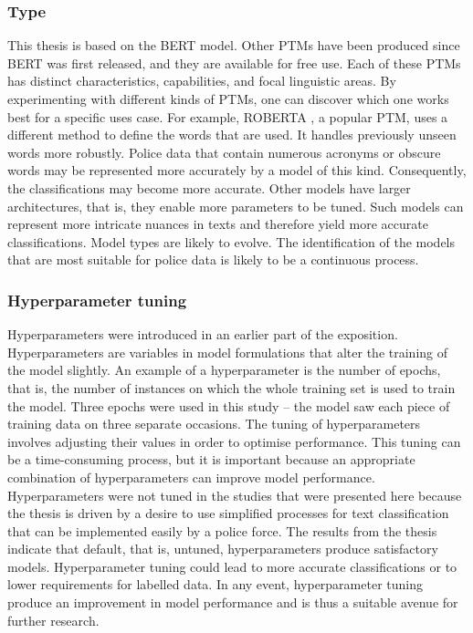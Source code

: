 \subsubsection{Type} This thesis is based on the BERT model. Other PTMs have been produced since BERT was first released, and they are available for free use. Each of these PTMs has distinct characteristics, capabilities, and focal linguistic areas. By experimenting with different kinds of PTMs, one can discover which one works best for a specific uses case. For example, ROBERTA \parencite{liu2019roberta}, a popular PTM, uses a different method to define the words that are used. It handles previously unseen words more robustly. Police data that contain numerous acronyms or obscure words may be represented more accurately by a model of this kind. Consequently, the classifications may become more accurate. Other models have larger architectures, that is, they enable more parameters to be tuned. Such models can represent more intricate nuances in texts and therefore yield more accurate classifications. Model types are likely to evolve. The identification of the models that are most suitable for police data is likely to be a continuous process.

\subsubsection{Hyperparameter tuning} Hyperparameters were introduced in an earlier part of the exposition. Hyperparameters are variables in model formulations that alter the training of the model slightly. An example of a hyperparameter is the number of epochs, that is, the number of instances on which the whole training set is used to train the model. Three epochs were used in this study – the model saw each piece of training data on three separate occasions. The tuning of hyperparameters involves adjusting their values in order to optimise performance. This tuning can be a time-consuming process, but it is important because an appropriate combination of hyperparameters can improve model performance. Hyperparameters were not tuned in the studies that were presented here because the thesis is driven by a desire to use simplified processes for text classification that can be implemented easily by a police force. The results from the thesis indicate that default, that is, untuned, hyperparameters produce satisfactory models. Hyperparameter tuning could lead to more accurate classifications or to lower requirements for labelled data. In any event, hyperparameter tuning produce an improvement in model performance and is thus a suitable avenue for further research.

